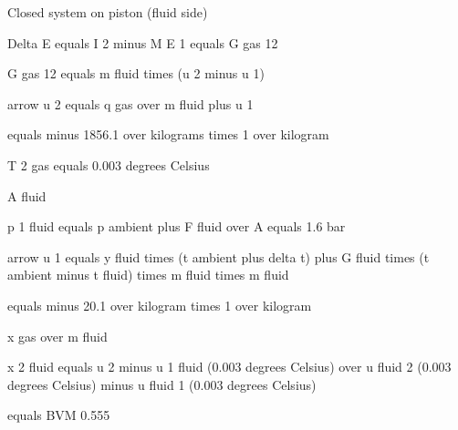 Closed system on piston (fluid side)

Delta E equals I 2 minus M E 1 equals G gas 12

G gas 12 equals m fluid times (u 2 minus u 1)

arrow u 2 equals q gas over m fluid plus u 1

equals minus 1856.1 over kilograms times 1 over kilogram

T 2 gas equals 0.003 degrees Celsius

A fluid

p 1 fluid equals p ambient plus F fluid over A equals 1.6 bar

arrow u 1 equals y fluid times (t ambient plus delta t) plus G fluid times (t ambient minus t fluid) times m fluid times m fluid

equals minus 20.1 over kilogram times 1 over kilogram

x gas over m fluid

x 2 fluid equals u 2 minus u 1 fluid (0.003 degrees Celsius) over u fluid 2 (0.003 degrees Celsius) minus u fluid 1 (0.003 degrees Celsius)

equals BVM 0.555